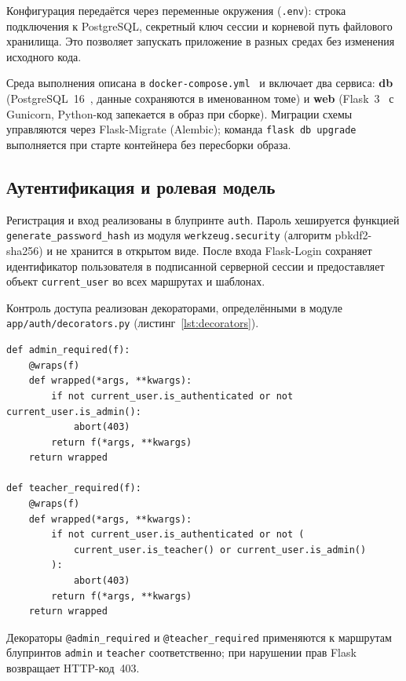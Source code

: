 Конфигурация передаётся через переменные окружения (\texttt{.env}): строка
подключения к PostgreSQL, секретный ключ сессии и корневой путь файлового
хранилища. Это позволяет запускать приложение в разных средах без
изменения исходного кода.

Среда выполнения описана в \texttt{docker-compose.yml}~\cite{docker_docs}
и включает два сервиса: \textbf{db} (PostgreSQL~16~\cite{postgresql_docs},
данные сохраняются в именованном томе) и \textbf{web} (Flask~3~\cite{flask_docs}
с Gunicorn, Python-код запекается в образ при сборке).
Миграции схемы управляются через Flask-Migrate (Alembic); команда
\texttt{flask db upgrade} выполняется при старте контейнера без пересборки образа.

\subsection{Аутентификация и ролевая модель}

Регистрация и вход реализованы в блупринте \texttt{auth}. Пароль
хешируется функцией \texttt{generate\_password\_hash} из модуля
\texttt{werkzeug.security} (алгоритм pbkdf2-sha256) и не хранится
в открытом виде. После входа Flask-Login
сохраняет идентификатор пользователя в подписанной серверной сессии
и предоставляет объект \texttt{current\_user} во всех маршрутах и шаблонах.

Контроль доступа реализован декораторами, определёнными в модуле
\texttt{app/auth/decorators.py} (листинг~\ref{lst:decorators}).

\begin{lstlisting}[caption={Декораторы ролевого доступа (app/auth/decorators.py)}, label={lst:decorators}]
def admin_required(f):
    @wraps(f)
    def wrapped(*args, **kwargs):
        if not current_user.is_authenticated or not current_user.is_admin():
            abort(403)
        return f(*args, **kwargs)
    return wrapped

def teacher_required(f):
    @wraps(f)
    def wrapped(*args, **kwargs):
        if not current_user.is_authenticated or not (
            current_user.is_teacher() or current_user.is_admin()
        ):
            abort(403)
        return f(*args, **kwargs)
    return wrapped
\end{lstlisting}

Декораторы \texttt{@admin\_required} и \texttt{@teacher\_required}
применяются к маршрутам блупринтов \texttt{admin} и \texttt{teacher}
соответственно; при нарушении прав Flask возвращает HTTP-код~403.

